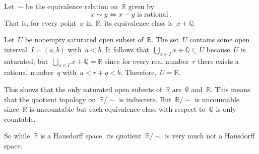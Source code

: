 Let~$∼$ be the equivalence relation on~$ℝ$ given by
\[
	x ∼ y \iff \text{$x - y$ is rational} \,.
\]
That is, for every point~$x$ in~$ℝ$, its equivalence class is~$x + ℚ$.

Let~$U$ be nonempty saturated open subset of~$ℝ$.
The set~$U$ contains some open interval~$I = (a, b)$ with~$a < b$.
It follows that~$⋃_{x ∈ I} x + ℚ ⊆ U$ because~$U$ is saturated, but~$⋃_{x ∈ I} x + ℚ = ℝ$ since for every real number~$r$ there exists a rational number~$q$ with~$a < r + q < b$.
Therefore,~$U = ℝ$.

This shows that the only saturated open subsets of~$ℝ$ are~$∅$ and~$ℝ$.
This means that the quotient topology on~$ℝ / {∼}$ is indiscrete.
But~$ℝ / {∼}$ is uncountable since~$ℝ$ is uncountable but each equivalence class with respect to~$ℚ$ is only countable.

So while~$ℝ$ is a Hausdorff space, its quotient~$ℝ / {∼}$ is very much not a Hausdorff space.
